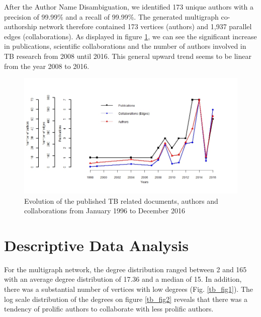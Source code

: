 After the Author Name Disambiguation, we identified 173 unique authors with a precision of 99.99\% and a recall of 99.99\%. The generated multigraph co-authorship network therefore contained 173 vertices (authors) and 1,937 parallel edges (collaborations). As displayed in figure \ref{tb_pubDist}, we can see the significant increase in publications, scientific collaborations and the number of authors involved in TB research from 2008 until 2016. This general upward trend seems to be linear from the year 2008 to 2016. \\

\begin{figure}[h!]
\centering
\includegraphics[scale=0.6]{Chapters/tb/pubDist}
\caption{Evolution of the published TB related documents, authors and collaborations from January 1996 to December 2016}
\label{tb_pubDist}
\end{figure}

\section{Descriptive Data Analysis}
\label{sec:tb_descstat}
For the multigraph network, the degree distribution ranged between 2 and 165 with an average degree distribution of 17.36 and a median of 15. In addition, there was a substantial number of vertices with low degrees (Fig. \ref{tb_fig1}). The log scale distribution of the degrees on figure \ref{tb_fig2} reveals that there was a tendency of prolific authors to collaborate with less prolific authors. 


